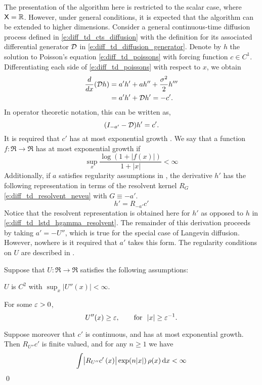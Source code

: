 The presentation of the algorithm here is restricted to the scalar case, where ${\sf X} = \mathbb{R}$. However, under general conditions, it is expected that the algorithm can be extended to higher dimensions. %
Consider a general continuous-time diffusion process defined in \eqref{e:diff_td_cts_diffusion} with the definition for its associated differential generator ${\cal D}$ in \eqref{e:diff_td_diffusion_generator}. Denote by $h$ the solution to Poisson's equation \eqref{e:diff_td_poissons} with forcing function $c \in C^1$.  Differentiating each side of \eqref{e:diff_td_poissons} with respect to $x$, we obtain
\begin{equation}
\begin{aligned}
\frac{d}{dx} ({\cal D} h) & = a'h' + ah'' + \frac{\sigma^2}{2} h''' \\
&  = 	a'h' + {\cal D} h'  = -c'.
\end{aligned}
\end{equation}
In operator theoretic notation, this can be written as,
\begin{equation}
(I_{-a'} - {\cal D})h' = c'.
\end{equation}
It is required that $c'$ has at most exponential growth \cite{devkonmey17b}. We say that a function $f\colon\Re\to\Re$ has at most exponential growth if
\begin{equation}
\sup_x  \frac{ \log(1+|f(x)|)}{1+|x|}  <\infty
\end{equation}
Additionally, if $a$ satisfies regularity assumptions in , the derivative $h'$ has the following representation in terms of the resolvent kernel $R_G$ \eqref{e:diff_td_resolvent_neveu} with $G \equiv -a'$. 
\begin{equation}
h' = R_{-a'} c'
\label{e:diff_td_gradTD_h'_resolvent}
\end{equation}
Notice that the resolvent representation is obtained here for $h'$ as opposed to $h$ in \eqref{e:diff_td_lstd_hgamma_resolvent}. The remainder of this derivation proceeds by taking $a' = -U''$, which is true for the special case of Langevin diffusion. However, nowhere is it required that $a'$ takes this form. The regularity conditions on $U$ are described in .
\begin{proposition}
	\label{prop:regularity_U}
	Suppose that $U\colon\Re\to\Re$ satisfies the following assumptions:
	\begin{romannum}
		\item $U$ is $C^2$ with $\sup_x |U''(x)| <\infty$.
		\item  For some $\varepsilon>0$,
		\begin{equation}
		U''(x) \ge \varepsilon,\qquad \text{for} \ \ |x|\ge \varepsilon^{-1}.
		\end{equation}
	\end{romannum}
	Suppose moreover that $c'$ is continuous, and has at most exponential growth.
	Then $ R_{U''} c'$ is finite valued, and for any $n\ge 1$ we have
	\begin{equation}
	\int   \bigl|  R_{U''} c'\, (x) \bigr|\exp(n |x|)  \, \rho(x) \,\textmd{d} x  <\infty
	\end{equation}
	\qed
\end{proposition}

